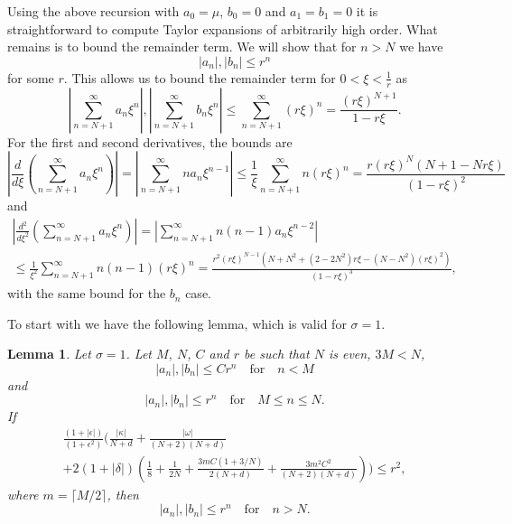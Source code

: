 \documentclass[11pt]{article}
\newtheorem{lemma}[definition]{Lemma}
\begin{document}
Using the above recursion with \(a_{0} = \mu\), \(b_{0} = 0\) and
\(a_{1} = b_{1} = 0\) it is straightforward to compute Taylor
expansions of arbitrarily high order. What remains is to bound the
remainder term. We will show that for \(n > N\) we have
\begin{equation*}
  |a_{n}|, |b_{n}| \leq r^{n}
\end{equation*}
for some \(r\). This allows us to bound the remainder term for \(0 <
\xi < \frac{1}{r}\) as
\begin{equation*}
  \left|\sum_{n = N + 1}^{\infty} a_{n}\xi^{n}\right|,
  \left|\sum_{n = N + 1}^{\infty} b_{n}\xi^{n}\right|
  \leq \sum_{n = N + 1}^{\infty}(r\xi)^{n}
  = \frac{(r\xi)^{N + 1}}{1 - r\xi}.
\end{equation*}
For the first and second derivatives, the bounds are
\begin{equation*}
  \left|\frac{d}{d\xi}\left(\sum_{n = N + 1}^{\infty} a_{n}\xi^{n}\right)\right|
  = \left|\sum_{n = N + 1}^{\infty} na_{n}\xi^{n - 1}\right|
  \leq \frac{1}{\xi}\sum_{n = N + 1}^{\infty}n(r\xi)^{n}
  = \frac{r(r\xi)^{N}(N + 1 - Nr\xi)}{(1 - r\xi)^{2}}
\end{equation*}
and
\begin{multline*}
  \left|\frac{d^{2}}{d\xi^{2}}\left(\sum_{n = N + 1}^{\infty} a_{n}\xi^{n}\right)\right|
  = \left|\sum_{n = N + 1}^{\infty} n(n - 1)a_{n}\xi^{n - 2}\right|\\
  \leq \frac{1}{\xi^{2}}\sum_{n = N + 1}^{\infty}n(n - 1)(r\xi)^{n}
  = \frac{r^{2}(r\xi)^{N-1}(N + N^2 + (2 - 2N^2)r\xi - (N - N^2)(r\xi)^2)}{(1 - r\xi)^{3}},
\end{multline*}
with the same bound for the \(b_n\) case.

To start with we have the following lemma, which is valid for
\(\sigma = 1\).
\begin{lemma}\label{lemma:tail-bound}
  Let \(\sigma = 1\). Let \(M\), \(N\), \(C\) and \(r\) be such that
  \(N\) is even, \(3M < N\),
  \begin{equation*}
    |a_n|, |b_n| \leq C r^n \quad\text{for}\quad n < M
  \end{equation*}
  and
  \begin{equation*}
    |a_n|, |b_n| \leq r^n \quad\text{for}\quad M \leq n \leq N.
  \end{equation*}
  If
  \begin{multline}
    \label{eq:tail-bound-inequality}
    \frac{(1 + |\epsilon|)}{(1 + \epsilon^{2})}\Bigg(
      \frac{|\kappa|}{N + d}
      + \frac{|\omega|}{(N + 2)(N + d)}\\
      + 2(1 + |\delta|)\left(
        \frac{1}{8} + \frac{1}{2N}
        + \frac{3mC(1 + 3/N)}{2(N + d)}
        + \frac{3m^{2}C^{2}}{(N + 2)(N + d)}
      \right)
    \Bigg) \leq r^2,
  \end{multline}
  where \(m = \lceil M / 2 \rceil\), then
  \begin{equation*}
    |a_{n}|, |b_{n}| \leq r^{n} \quad\text{for}\quad n > N.
  \end{equation*}
\end{lemma}
\end{document}
